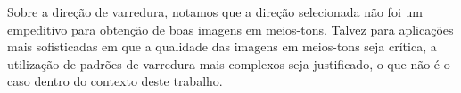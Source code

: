 \documentclass{article}
\begin{document}
Sobre a direção de varredura, notamos que a direção selecionada não foi um empeditivo para obtenção de boas imagens em meios-tons. Talvez para aplicações mais sofisticadas em que a qualidade das imagens em meios-tons seja crítica, a utilização de padrões de varredura mais complexos seja justificado, o que não é o caso dentro do contexto deste trabalho.

\end{document}
